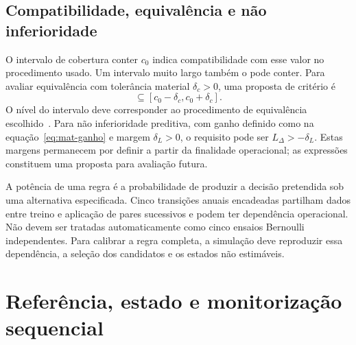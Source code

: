 
\subsection{Compatibilidade, equivalência e não inferioridade}
\label{sec:mat-equivalencia}
O intervalo de cobertura conter $c_0$ indica compatibilidade com esse valor no procedimento usado. Um intervalo muito largo também o pode conter. Para avaliar equivalência com tolerância material $\delta_c>0$, uma proposta de critério é
\begin{equation}
[L_c,U_c]\subseteq[c_0-\delta_c,c_0+\delta_c].
\label{eq:mat-equivalencia}
\end{equation}
O nível do intervalo deve corresponder ao procedimento de equivalência escolhido~\parencite{Lakens2017}. Para não inferioridade preditiva, com ganho definido como na equação~\ref{eq:mat-ganho} e margem $\delta_L>0$, o requisito pode ser $L_\Delta>-\delta_L$. Estas margens permanecem por definir a partir da finalidade operacional; as expressões constituem uma proposta para avaliação futura.

A potência de uma regra é a probabilidade de produzir a decisão pretendida sob uma alternativa especificada. Cinco transições anuais encadeadas partilham dados entre treino e aplicação de pares sucessivos e podem ter dependência operacional. Não devem ser tratadas automaticamente como cinco ensaios Bernoulli independentes. Para calibrar a regra completa, a simulação deve reproduzir essa dependência, a seleção dos candidatos e os estados não estimáveis.


\section{Referência, estado e monitorização sequencial}
\label{sec:mat-monitorizacao}

